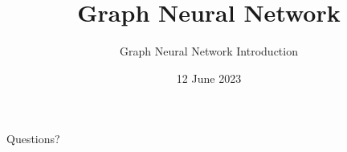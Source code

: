 \documentclass{beamer}
\title{Graph Neural Network}
\subtitle{Graph Neural Network Introduction}
\author{}
\institute{}
\date{12 June 2023}
\begin{document}
\begin{frame}
\titlepage
    
\end{frame}





\begin{frame}[standout]
\flushleft
Questions?
\end{frame}
\end{document}

